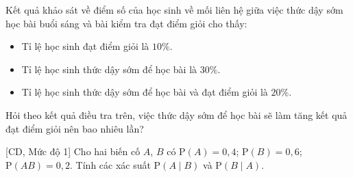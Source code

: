 \begin{bt}%
	Kết quả khảo sát về điểm số của học sinh về mối liên hệ giữa việc thức dậy sớm học bài buổi sáng và bài kiểm tra đạt điểm giỏi  cho thấy:
	\begin{itemize}
		\item Tỉ lệ học sinh  đạt điểm giỏi là $10\%$.
		\item  Tỉ lệ học sinh thức dậy sớm để học bài là $30\%$.
		\item Tỉ lệ học sinh thức dậy sớm để học bài và đạt điểm giỏi  là $20\%$.
	\end{itemize}
	Hỏi theo kết quả điều tra trên, việc thức dậy  sớm để học bài sẽ làm tăng kết quả đạt điểm giỏi nên bao nhiêu lần?
\end{bt}

\begin{bt}%
[CD, Mức độ 1]%
	Cho hai biến cố $A$, $B$ có $\mathrm{P}(A)=0{,}4$; $\mathrm{P}(B)=0{,}6$; $\mathrm{P}(AB)=0{,}2$. Tính các xác suất $\mathrm{P}(A\mid B)$ và $\mathrm{P}(B\mid A)$.
\end{bt}

